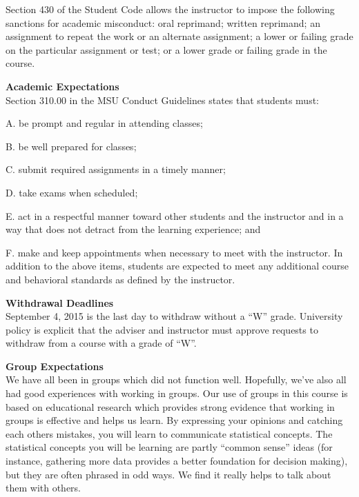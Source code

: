 Section 430 of the Student Code allows the instructor to impose the
following sanctions for academic misconduct: oral reprimand; written
reprimand; an assignment to repeat the work or an alternate
assignment; a lower or failing grade on the particular assignment or
test; or a lower grade or failing grade in the course.  

 {\bf Academic Expectations  }\\
Section 310.00 in the MSU Conduct Guidelines states that students
must:\vspace{-.15in}
\begin{list}{}{}
\item[A.] be prompt and regular in attending classes;
\item[B.] be well prepared for classes; 
\item[C.] submit required assignments in a timely manner;
\item[D.] take exams when scheduled;
\item[E.] act in a respectful manner toward other students and the
  instructor and in a way that does not detract from the learning
  experience; and 
\item[F.] make and keep appointments when necessary to meet with the
  instructor.  
In addition to the above items, students are expected to meet any
additional course and behavioral standards as defined by the
instructor. 
\end{list}

  {\bf Withdrawal Deadlines  }\\
 September 4, 2015 is the last day to withdraw without a ``W'' grade.
 University policy is explicit that the adviser and instructor must
 approve requests to withdraw from a course with a grade of ``W''.  


 {\bf Group Expectations }\\
 We have all been in groups which did not function well.  Hopefully,
 we've also all had good experiences with working in groups.  Our use
 of groups in this course is based on educational research which
 provides strong evidence that working in groups is effective and helps
 us learn.  By expressing your opinions and catching each others
 mistakes, you will learn to communicate statistical concepts.  The
 statistical concepts you will be learning are partly ``common sense''
 ideas (for instance, gathering more data provides a better foundation
 for decision making),  but they are often  phrased in
 odd ways. We find it really helps to talk about them  with
 others. 

